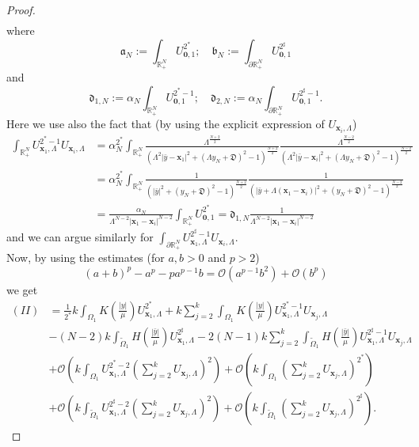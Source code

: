 \documentclass[11pt,a4paper]{amsart}
\begin{document}
\begin{proof}
$$\begin{aligned}
\end{aligned}$$ where
$$\mathfrak a_N:=\int_{\mathbb R^N_+}U_{\mathbf{0},1}^{2^*};\quad \mathfrak b_N:=\int_{\partial\mathbb R^N_+}U_{\mathbf{0},1}^{2^\sharp}$$
and
$$\mathfrak d_{1, N}:=\alpha_N\int_{\mathbb R^N_+}U_{\mathbf{0},1}^{2^*-1};\quad \mathfrak d_{2, N}:=\alpha_N\int_{\partial\mathbb R^N_+}U_{\mathbf{0},1}^{2^\sharp-1}.$$
Here we use also the fact that (by using the explicit expression of $U_{\mathbf{x}_i,\Lambda}$) $$\begin{aligned} \int_{\mathbb R^N_+}U_{\mathbf{x}_1,\Lambda}^{2^*-1}U_{\mathbf{x}_i,\Lambda}&=\alpha_N^{2^*}\int_{\mathbb R^N_+} \frac{\Lambda^{\frac{N+2}{2}}}{\left(\Lambda^2|\bar y-\mathbf{x}_1|^2+(\Lambda y_N+\mathfrak D)^2-1\right)^{\frac{N+2}{2}}}\frac{\Lambda^{\frac{N-2}{2}}}{\left(\Lambda^2|\bar y-\mathbf{x}_i|^2+(\Lambda y_N+\mathfrak D)^2-1\right)^{\frac{N-2}{2}}}\\
&=\alpha_N^{2^*}\int_{\mathbb R^N_+} \frac{1}{\left(|\bar y|^2+(y_N+\mathfrak D)^2-1\right)^{\frac{N+2}{2}}}\frac{1}{\left(|\bar y+\Lambda(\mathbf{x}_1-\mathbf{x}_i)|^2+(y_N+\mathfrak D)^2-1\right)^{\frac{N-2}{2}}}\\
&=\frac{\alpha_N}{\Lambda^{N-2}|\mathbf{x}_1-\mathbf{x}_i|^{N-2}}\int_{\mathbb R^N_+}U_{\mathbf{0},1}^{2^*}=\mathfrak d_{1, N}\frac{1}{\Lambda^{N-2}|\mathbf{x}_1-\mathbf{x}_i|^{N-2}}\end{aligned}$$ and we can argue similarly for $\int_{\partial\mathbb R^N_+}U_{\mathbf{x}_1,\Lambda}^{2^\sharp-1}U_{\mathbf{x}_i,\Lambda}$.\\
Now, by using the estimates (for $a, b>0$ and $p>2$) $$(a+b)^p-a^p-pa^{p-1}b=\mathcal O(a^{p-1}b^2)+\mathcal O(b^p)$$ we get
$$\begin{aligned}(II)&=\frac{1}{2^*}k\int_{\Omega_1}K\left(\frac{|y|}{\mu}\right)U_{\mathbf{x}_1,\Lambda}^{2^*}+k\sum_{j=2}^k\int_{\Omega_1}K\left(\frac{|y|}{\mu}\right)U_{\mathbf{x}_1,\Lambda}^{2^*-1}U_{\mathbf{x}_j,\Lambda}\\
&-(N-2)k\int_{\widetilde\Omega_1}H\left(\frac{|\bar y|}{\mu}\right)U_{\mathbf{x}_1,\Lambda}^{2^\sharp}-2(N-1)k\sum_{j=2}^k\int_{\widetilde\Omega_1}H\left(\frac{|\bar y|}{\mu}\right)U_{\mathbf{x}_1,\Lambda}^{2^\sharp-1}U_{\mathbf{x}_j,\Lambda}\\
&+\mathcal O\left(k\int_{\Omega_1}U_{\mathbf{x}_1,\Lambda}^{2^*-2}\left(\sum_{j=2}^kU_{\mathbf{x}_j,\Lambda}\right)^2\right)+\mathcal O\left(k\int_{\Omega_1}\left(\sum_{j=2}^kU_{\mathbf{x}_j,\Lambda}\right)^{2^*}\right)\\
&+\mathcal O\left(k\int_{\widetilde\Omega_1}U_{\mathbf{x}_1,\Lambda}^{2^\sharp-2}\left(\sum_{j=2}^kU_{\mathbf{x}_j,\Lambda}\right)^2\right)+\mathcal O\left(k\int_{\widetilde\Omega_1}\left(\sum_{j=2}^kU_{\mathbf{x}_j,\Lambda}\right)^{2^\sharp}\right).

\end{aligned}$$
\end{proof}
\end{document}
